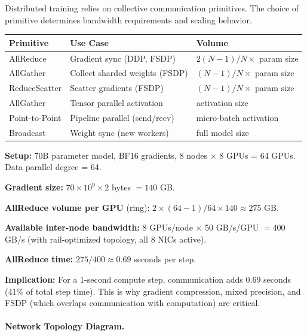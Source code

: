 Distributed training relies on collective communication primitives. The choice of primitive determines bandwidth requirements and scaling behavior.

\begin{keybox}
\begin{tabular}{@{}lp{5cm}p{8cm}@{}}
\toprule
\textbf{Primitive} & \textbf{Use Case} & \textbf{Volume} \\
\midrule
AllReduce & Gradient sync (DDP, FSDP) & $2(N-1)/N \times$ param size \\
AllGather & Collect sharded weights (FSDP) & $(N-1)/N \times$ param size \\
ReduceScatter & Scatter gradients (FSDP) & $(N-1)/N \times$ param size \\
AllGather & Tensor parallel activation & activation size \\
Point-to-Point & Pipeline parallel (send/recv) & micro-batch activation \\
Broadcast & Weight sync (new workers) & full model size \\
\bottomrule
\end{tabular}
\end{keybox}

\begin{examplebox}
\textbf{Setup:} 70B parameter model, BF16 gradients, 8 nodes $\times$ 8 GPUs = 64 GPUs. Data parallel degree = 64.

\textbf{Gradient size:} $70 \times 10^9 \times 2$ bytes $= 140$ GB.

\textbf{AllReduce volume per GPU} (ring): $2 \times (64-1)/64 \times 140 \approx 275$ GB.

\textbf{Available inter-node bandwidth:} 8 GPUs/node $\times$ 50 GB/s/GPU $= 400$ GB/s (with rail-optimized topology, all 8 NICs active).

\textbf{AllReduce time:} $275 / 400 \approx 0.69$ seconds per step.

\textbf{Implication:} For a 1-second compute step, communication adds 0.69 seconds (41\% of total step time). This is why gradient compression, mixed precision, and FSDP (which overlaps communication with computation) are critical.
\end{examplebox}

\paragraph{Network Topology Diagram.}
\label{network-topology-diagram.}

